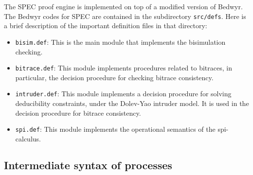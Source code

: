\documentclass{article}
\begin{document}
The SPEC proof engine is implemented on top of a modified version of Bedwyr. 
The Bedwyr codes for SPEC are contained in the subdirectory \texttt{src/defs}. 
Here is a brief description of the important definition files in that directory:
\begin{itemize}
\item \texttt{bisim.def}: This is the main module that implements the bisimulation checking.
\item \texttt{bitrace.def}: This module implements procedures related to bitraces, in particular,
the decision procedure for checking bitrace consistency.

\item \texttt{intruder.def}: This module implements a decision procedure for solving
deducibility constraints, under the Dolev-Yao intruder model. 
It is used in the decision procedure for bitrace consistency.

\item \texttt{spi.def}: This module implements the operational semantics of the spi-calculus.

\end{itemize}

\subsection{Intermediate syntax of processes}
\end{document}
